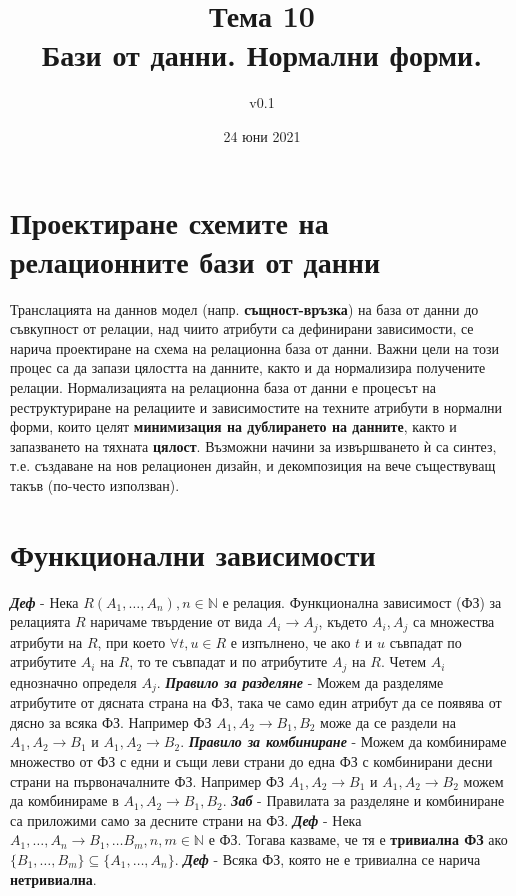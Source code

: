 \documentclass[fleqn,12pt]{article}
\title{Тема 10\\ Бази от данни. Нормални форми.}
\author{v0.1}
\date{24 юни 2021}
\begin{document}
\maketitle
\tableofcontents
\pagebreak


\section{Проектиране схемите на релационните бази от данни}

Транслацията на даннов модел (напр. \textbf{същност-връзка}) на база от данни до съвкупност от релации, над чиито атрибути са дефинирани зависимости, се нарича проектиране на схема на релационна база от данни.
Важни цели на този процес са да запази цялостта на данните, както и да нормализира получените релации.
\bigbreak
Нормализацията на релационна база от данни е процесът на реструктуриране на релациите и зависимостите на техните атрибути в нормални форми, които целят \textbf{минимизация на дублирането на данните}, както и запазването на тяхната \textbf{цялост}.
Възможни начини за извършването ѝ са синтез, т.е. създаване на нов релационен дизайн, и декомпозиция на вече съществуващ такъв (по-често използван).

\section{Функционални зависимости}

\textbf{\textit{Деф}} - Нека $R(A_1, \dots, A_n), n \in \mathbb{N}$ е релация.
Функционална зависимост (ФЗ) за релацията $R$ наричаме твърдение от вида $A_i \rightarrow A_j$, където $A_i, A_j$ са множества атрибути на $R$, при което $\forall t, u \in R$ е изпълнено, че ако $t$ и $u$ съвпадат по атрибутите $A_i$ на $R$, то те съвпадат и по атрибутите $A_j$ на $R$.
Четем $A_i$ еднозначно определя $A_j$.
\bigbreak
\textbf{\textit{Правило за разделяне}} - Можем да разделяме атрибутите от дясната страна на ФЗ, така че само един атрибут да се появява от дясно за всяка ФЗ.
Например ФЗ $A_1, A_2 \rightarrow B_1, B_2$ може да се раздели на $A_1, A_2 \rightarrow B_1$ и $A_1, A_2 \rightarrow B_2$.
\bigbreak
\textbf{\textit{Правило за комбиниране}} - Можем да комбинираме множество от ФЗ с едни и същи леви страни до една ФЗ с комбинирани десни страни на първоначалните ФЗ.
Например ФЗ $A_1, A_2 \rightarrow B_1$ и $A_1, A_2 \rightarrow B_2$ можем да комбинираме в $A_1, A_2 \rightarrow B_1, B_2$.
\bigbreak
\textbf{\textit{Заб}} - Правилата за разделяне и комбиниране са приложими само за десните страни на ФЗ.
\bigbreak
\textbf{\textit{Деф}} - Нека $A_1, \dots, A_n \rightarrow B_1, \dots B_m, n, m \in \mathbb{N}$ е ФЗ.
Тогава казваме, че тя е \textbf{тривиална ФЗ} ако $\{B_1, \dots, B_m\} \subseteq \{A_1, \dots, A_n\}$.
\bigbreak
\textbf{\textit{Деф}} - Всяка ФЗ, която не е тривиална се нарича \textbf{нетривиална}.
\end{document}
